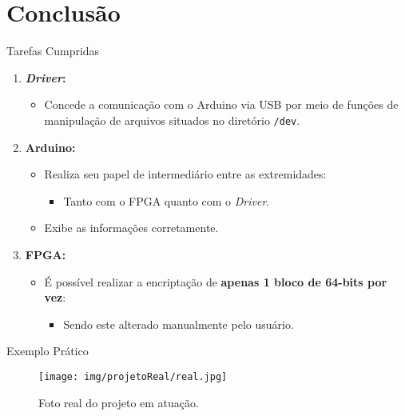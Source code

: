 
\section{Conclusão}
	\begin{frame}{Tarefas Cumpridas}
		\begin{enumerate}
			\item \textbf{\textit{Driver}:}
			\begin{itemize}
				\item Concede a comunicação com o Arduino via USB por meio de funções de manipulação de arquivos situados no diretório {\tt /dev}.
			\end{itemize}
			\item \textbf{Arduino:} 
			\begin{itemize}
				\item Realiza seu papel de intermediário entre as extremidades:
				\begin{itemize}
					\item Tanto com o FPGA quanto com o \textit{Driver}.
				\end{itemize}
				\item Exibe as informações corretamente.
			\end{itemize}
			\item \textbf{FPGA:}
			\begin{itemize}
				\item É possível realizar a encriptação de \textbf{apenas 1 bloco de 64-bits por vez}:
				\begin{itemize}
					\item Sendo este alterado manualmente pelo usuário.
				\end{itemize} 
			\end{itemize}

		\end{enumerate}
	\end{frame}
	\begin{frame}{Exemplo Prático}
		\begin{figure}[p]
			\centering
			\texttt{[image: img/projetoReal/real.jpg]}
			\caption{Foto real do projeto em atuação.}
			\label{fig:projetoreal}
		\end{figure}
	\end{frame}
